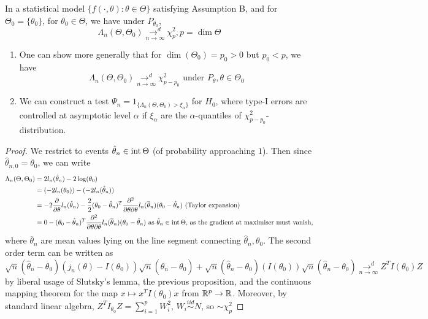 \documentclass[a4paper]{article}
\begin{document}
\begin{thm}[Wilks']
	In a statistical model $\{f\left( \cdot , \theta \right) : \theta \in \Theta \}$ satisfying Assumption B, and for $\Theta_0 = \{\theta_0\} $, for $\theta_0 \in \Theta$, we have under $P_{\theta_0}$,
	\[
		\Lambda_{n}(\Theta, \Theta_0) \underset{n\to \infty}{\to ^{d}} \chi^2_{p},p = \dim\Theta
	\] 
	
\end{thm}

\begin{remark}
	\begin{enumerate}
		\item One can show more generally that for $\dim(\Theta_0) = p_0 > 0$ but $p_0 < p$, we have
	\[
		\Lambda_{n}(\Theta, \Theta_0) \underset{n\to \infty}{\to ^{d}} \chi^2_{p-p_0} \text{ under  } P_{\theta}, \theta \in \Theta_0
	\]
\item We can construct a test $\Psi_{n} = 1_{\{ \Lambda_n (\Theta, \Theta_0) > \xi_{\alpha}\} }$ for $H_0$, where type-I errors are controlled at asymptotic level $\alpha$ if $\xi_{\alpha}$ are the $\alpha$-quantiles of  $\chi^2_{p-p_0}$-distribution.
	\end{enumerate}
\end{remark}

\begin{proof}
	We restrict to events $\hat{\theta}_n \in\operatorname{int} \Theta$ (of probability approaching $1$). Then since $\hat{\theta}_{n,0} = \theta_0$, we can write 
	\begin{align*}
		\Lambda_n(\Theta,\Theta_0) &= 2l_n(\hat{\theta}_n) - 2\log(\theta_0) \\
		&= (-2l_n(\theta_0)) -(-2l_n(\hat{\theta}_n)) \\
		&= -2 \frac{\partial }{\partial \theta} l_n(\hat{\theta}_n) - \frac{2}{2} (\theta_0 - \hat{\theta}_n)^{T} \frac{\partial ^2}{\partial \theta\partial\theta} l_n(\overline{\theta}_n)(\theta_0 - \hat{\theta}_n) \text{ (Taylor expansion)} \\ 
		&= 0 - (\theta_0 - \hat{\theta}_n)^{T} \frac{\partial ^2}{\partial \theta\partial\theta} l_n(\overline{\theta}_n)(\theta_0 - \hat{\theta}_n) \text{ as $\hat{\theta}_n \in\operatorname{int} \Theta$, as the gradient at maximiser must vanish}
	,\end{align*}
	where $\overline{\theta}_n$ are mean values lying on the line segment connecting $\hat{\theta}_n, \theta_0$. The second order term can be written as
\[
	\sqrt{n}(\hat{\theta}_n - \theta_0)(j_n(\theta) - I(\theta_0))\sqrt{n}(\hat{\theta}_n - \theta_0) + \sqrt{n}(\hat{\theta}_n - \theta_0)(I(\theta_0))\sqrt{n}(\hat{\theta}_n - \theta_0) \underset{n\to \infty}{\to ^{d}} Z^{T}I(\theta_0)Z
		\]
by liberal usage of Slutsky's lemma, the previous proposition, and the continuous mapping theorem for the map $x \mapsto x^{T}I(\theta_0)x$ from $\mathbb{R}^{p} \to \mathbb{R}$. Moreover, by standard linear algebra, $Z^{T}I_{\theta_0}Z = \sum_{i=1}^{p} W_{i}^2$, $W_i \stackrel{iid}{\sim} N$, so $\sim \chi^2_{p}$ 
\end{proof}
\end{document}
